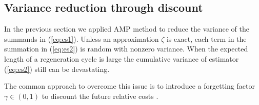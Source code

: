 \documentclass[11pt]{article}
\newcommand{\E}{\mathbb{E}}
\theoremstyle{definition}
\numberwithin{equation}{section}
\begin{document}
\subsection{Variance reduction through discount}\label{sec:ge}

In the previous section we applied AMP method to reduce the variance  of the summands in (\ref{eq:es1}). Unless an approximation $\zeta$ is exact, each term in  the summation in (\ref{eq:es2}) is random with nonzero variance.  When the expected length of a regeneration cycle is large the   cumulative variance  of estimator (\ref{eq:es2}) still can be devastating.


The common approach to overcome this issue  is to introduce a forgetting   factor $\gamma\in (0,1)$
 to discount the future relative costs  \cite{Jaakkola1994, Baxter2001, Marbach2001, Kakade2001, Thomas2014, Schulman2016}. %
\end{document}
